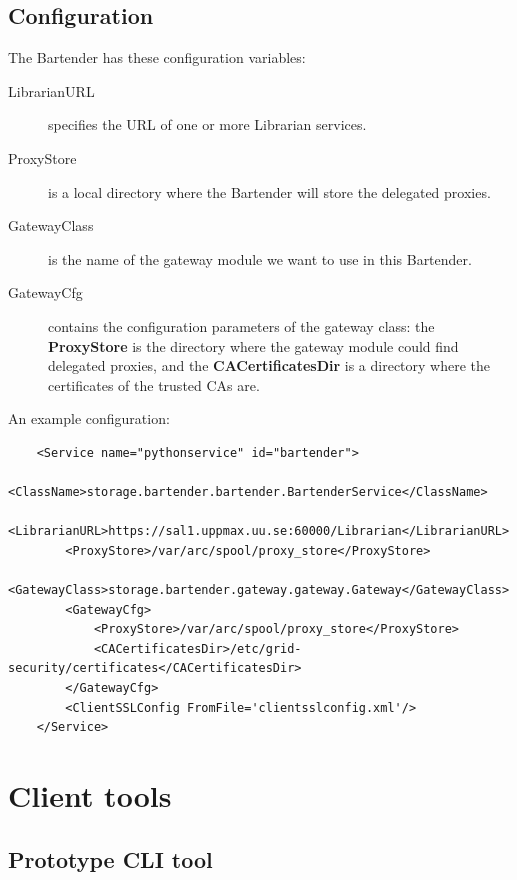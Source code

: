 \documentclass{book}
\begin{document}
\subsection{Configuration} %

The Bartender has these configuration variables:

\begin{description}
    \item[LibrarianURL] specifies the URL of one or more Librarian services.
    \item[ProxyStore] is a local directory where the Bartender will store the delegated proxies.
    \item[GatewayClass] is the name of the gateway module we want to use in this Bartender.
    \item[GatewayCfg] contains the configuration parameters of the gateway class: the \textbf{ProxyStore} is the directory where the gateway module could find delegated proxies, and the \textbf{CACertificatesDir} is a directory where the certificates of the trusted CAs are. 
\end{description}

An example configuration:

\begin{verbatim}
    <Service name="pythonservice" id="bartender">
        <ClassName>storage.bartender.bartender.BartenderService</ClassName>
        <LibrarianURL>https://sal1.uppmax.uu.se:60000/Librarian</LibrarianURL>
        <ProxyStore>/var/arc/spool/proxy_store</ProxyStore>
        <GatewayClass>storage.bartender.gateway.gateway.Gateway</GatewayClass>
        <GatewayCfg>
            <ProxyStore>/var/arc/spool/proxy_store</ProxyStore>
            <CACertificatesDir>/etc/grid-security/certificates</CACertificatesDir>
        </GatewayCfg>
        <ClientSSLConfig FromFile='clientsslconfig.xml'/>
    </Service>
\end{verbatim}


\newpage

\section{Client tools} %
\label{sec:client_tools}

\subsection{Prototype CLI tool} %
\label{sub:prototype_cli_tool}
\end{document}
